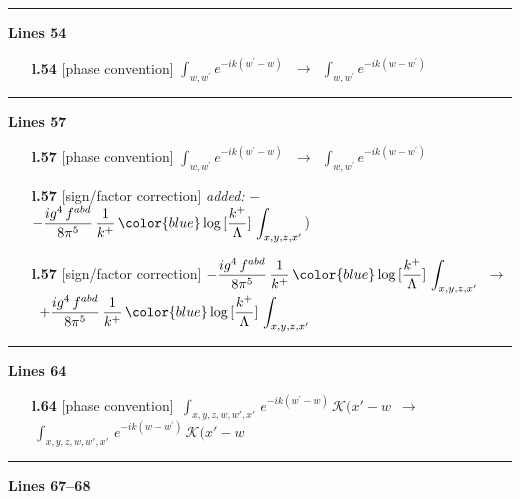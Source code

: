 \documentclass[10pt]{article}
\begin{document}
\noindent\rule{\linewidth}{0.3pt}\par\noindent\textbf{Lines 54} \par
\begin{itemize}[leftmargin=2.2em,itemsep=1pt,topsep=2pt]
\item[\textbf{l.54}] \textsf{\small [phase convention]} $\displaystyle \int_{w, w^\prime} e^{-ik(w^\prime-w)}\,$\ $\longrightarrow$\ $\displaystyle \int_{w, w^\prime} e^{-ik(w-w^\prime)}\,$
\end{itemize}
\noindent\rule{\linewidth}{0.3pt}\par\noindent\textbf{Lines 57} \par
\begin{itemize}[leftmargin=2.2em,itemsep=1pt,topsep=2pt]
\item[\textbf{l.57}] \textsf{\small [phase convention]} $\displaystyle \int_{w, w^\prime} e^{-ik(w^\prime-w)}\,$\ $\longrightarrow$\ $\displaystyle \int_{w, w^\prime} e^{-ik(w-w^\prime)}\,$
\item[\textbf{l.57}] \textsf{\small [sign/factor correction]} \emph{added:} $\displaystyle -$$\displaystyle -\frac{ig^{4}\, f^{abd}}{8\pi^{5}}\, \frac{1}{k^{+}}\,{\color{blue}\log{[\frac{k^{+}}{\Lambda}]}}\, \int_{x,y,z,x'}${\color{gray}\small)}
\item[\textbf{l.57}] \textsf{\small [sign/factor correction]} $\displaystyle - \frac{ig^{4}\, f^{abd}}{8\pi^{5}}\, \frac{1}{k^{+}}\,{\color{blue}\log{[\frac{k^{+}}{\Lambda}]}}\, \int_{x,y,z,x'}$\ $\longrightarrow$\ $\displaystyle + \frac{ig^{4}\, f^{abd}}{8\pi^{5}}\, \frac{1}{k^{+}}\,{\color{blue}\log{[\frac{k^{+}}{\Lambda}]}}\, \int_{x,y,z,x'}$
\end{itemize}
\noindent\rule{\linewidth}{0.3pt}\par\noindent\textbf{Lines 64} \par
\begin{itemize}[leftmargin=2.2em,itemsep=1pt,topsep=2pt]
\item[\textbf{l.64}] \textsf{\small [phase convention]} $\displaystyle \,\int_{x,y,z,w,w',x'}\,e^{-ik(w^\prime-w)}\, \mathcal{K}(x'-w$\ $\longrightarrow$\ $\displaystyle \,\int_{x,y,z,w,w',x'}\,e^{-ik(w-w^\prime)}\, \mathcal{K}(x'-w$
\end{itemize}
\noindent\rule{\linewidth}{0.3pt}\par\noindent\textbf{Lines 67--68} \par
\end{document}
